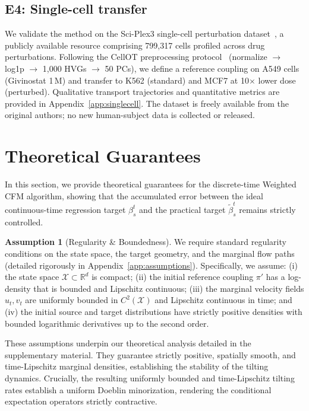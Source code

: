 \documentclass[11pt]{article}
\theoremstyle{definition}
\newtheorem{assumption}[theorem]{Assumption}
\numberwithin{equation}{section}%
\begin{document}
\subsection{E4: Single-cell transfer}
\label{sec:e4}

We validate the method on the Sci-Plex3 single-cell perturbation dataset~\citep{srivatsan2020massively}, a publicly available resource comprising 799{,}317 cells profiled across drug perturbations.
Following the CellOT preprocessing protocol~\citep{bunne2023cellot} (normalize $\to$ log1p $\to$ 1{,}000 HVGs $\to$ 50 PCs), we define a reference coupling on A549 cells (Givinostat 1\,\textmu M) and transfer to K562 (standard) and MCF7 at 10$\times$ lower dose (perturbed).
Qualitative transport trajectories and quantitative metrics are provided in Appendix~\ref{app:singlecell}.
The dataset is freely available from the original authors; no new human-subject data is collected or released.


\section{Theoretical Guarantees}
\label{sec:error_analysis}

In this section, we provide theoretical guarantees for the discrete-time Weighted CFM algorithm, showing that the accumulated error between the ideal continuous-time regression target $\beta_s^t$ and the practical target $\tilde{\beta}_s^t$ remains strictly controlled.

\begin{assumption}[Regularity \& Boundedness]
\label{ass:combined_regularity}
We require standard regularity conditions on the state space, the target geometry, and the marginal flow paths (detailed rigorously in Appendix~\ref{app:assumptions}).
Specifically, we assume: (i) the state space $\mathcal X \subset \mathbb R^d$ is compact; (ii) the initial reference coupling $\pi'$ has a log-density that is bounded and Lipschitz continuous; (iii) the marginal velocity fields $u_t, v_t$ are uniformly bounded in $C^2(\mathcal{X})$ and Lipschitz continuous in time; and (iv) the initial source and target distributions have strictly positive densities with bounded logarithmic derivatives up to the second order.
\end{assumption}

These assumptions underpin our theoretical analysis detailed in the supplementary material.
They guarantee strictly positive, spatially smooth, and time-Lipschitz marginal densities, establishing the stability of the tilting dynamics.
Crucially, the resulting uniformly bounded and time-Lipschitz tilting rates establish a uniform Doeblin minorization, rendering the conditional expectation operators strictly contractive.
\end{document}
